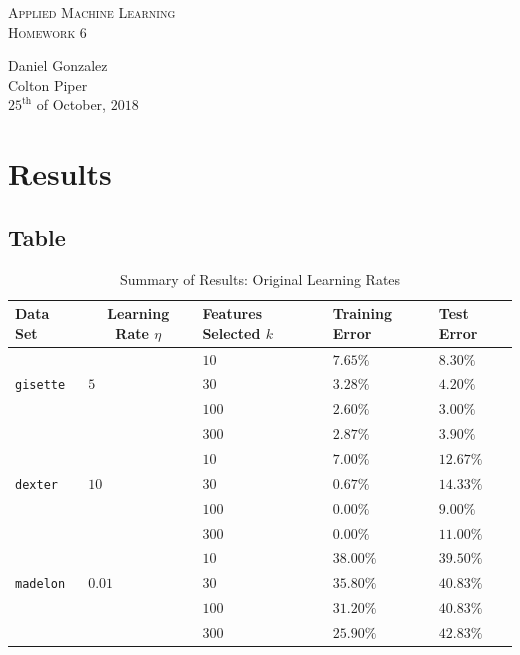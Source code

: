 \documentclass[UTF8]{article}
\begin{document}
\begin{center}
	\textsc{\huge Applied Machine Learning}\\
	\textsc{\Large Homework 6}\\
\end{center}
\begin{flushright}
	Daniel Gonzalez\\
    Colton Piper\\
	$25^{\text{th}}$ of October, $2018$
\end{flushright}


\section{Results}

\subsection{Table}

\begin{table}[H]
\centering
    \caption{Summary of Results: Original Learning Rates}
    \begin{tabular}{|l|l|l|l|l|}
        \hline
        Data Set&\multicolumn{1}{|c|}{Learning Rate $\eta$}&Features Selected $k$&Training Error&Test Error\\\hline
         &  & $10$ & $7.65\%$ & $8.30\%$\\\cline{3-5}
        \texttt{gisette} & $5$ & $30$ & $3.28\%$ & $4.20\%$\\\cline{3-5}
         &  & $100$ & $2.60\%$ & $3.00\%$\\\cline{3-5}
         &  & $300$ & $2.87\%$ & $3.90\%$\\\hline\cline{1-5}

         &  & $10$ & $7.00\%$ & $12.67\%$\\\cline{3-5}
        \texttt{dexter} & $10$ & $30$ & $0.67\%$ & $14.33\%$\\\cline{3-5}
         &  & $100$ & $0.00\%$ & $9.00\%$\\\cline{3-5}
         &  & $300$ & $0.00\%$ & $11.00\%$\\\hline\cline{1-5}

         &  & $10$ & $38.00\%$ & $39.50\%$\\\cline{3-5}
        \texttt{madelon} & $0.01$ & $30$ & $35.80\%$ & $40.83\%$\\\cline{3-5}
         &  & $100$ & $31.20\%$ & $40.83\%$\\\cline{3-5}
         &  & $300$ & $25.90\%$ & $42.83\%$\\\hline
    \end{tabular}
\end{table}
\end{document}
